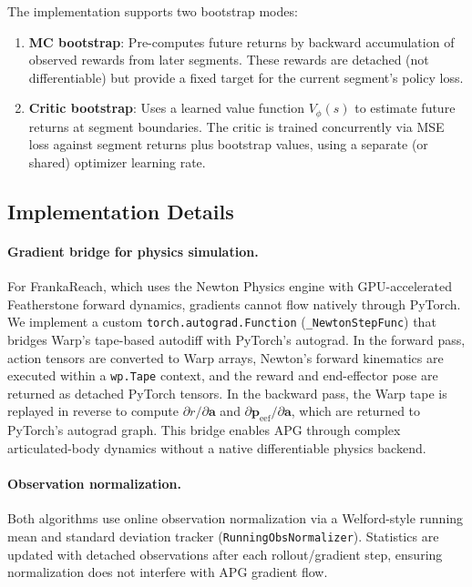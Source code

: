 \documentclass[11pt,a4paper]{article}
\newcommand{\bpf}{\mathbf{p}}
\newcommand{\ba}{\mathbf{a}}
\begin{document}
The implementation supports two bootstrap modes:

\begin{enumerate}
  \item \textbf{MC bootstrap}: Pre-computes future returns by backward accumulation of observed rewards from later segments. These rewards are detached (not differentiable) but provide a fixed target for the current segment's policy loss.

  \item \textbf{Critic bootstrap}: Uses a learned value function $V_\phi(s)$ to estimate future returns at segment boundaries. The critic is trained concurrently via MSE loss against segment returns plus bootstrap values, using a separate (or shared) optimizer learning rate.
\end{enumerate}

\subsection{Implementation Details}
\label{sec:implementation}

\paragraph{Gradient bridge for physics simulation.}
For FrankaReach, which uses the Newton Physics engine with GPU-accelerated Featherstone forward dynamics, gradients cannot flow natively through PyTorch. We implement a custom \texttt{torch.autograd.Function} (\texttt{\_NewtonStepFunc}) that bridges Warp's tape-based autodiff with PyTorch's autograd. In the forward pass, action tensors are converted to Warp arrays, Newton's forward kinematics are executed within a \texttt{wp.Tape} context, and the reward and end-effector pose are returned as detached PyTorch tensors. In the backward pass, the Warp tape is replayed in reverse to compute $\partial r / \partial \ba$ and $\partial \bpf_{\text{eef}} / \partial \ba$, which are returned to PyTorch's autograd graph. This bridge enables APG through complex articulated-body dynamics without a native differentiable physics backend.

\paragraph{Observation normalization.}
Both algorithms use online observation normalization via a Welford-style running mean and standard deviation tracker (\texttt{RunningObsNormalizer}). Statistics are updated with detached observations after each rollout/gradient step, ensuring normalization does not interfere with APG gradient flow.
\end{document}
